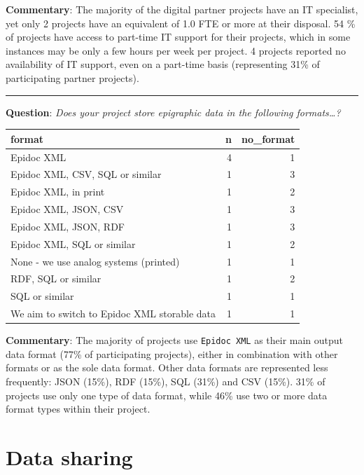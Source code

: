 \documentclass[
  12pt,
]{scrreprt}
\begin{document}
\normalsize

\textbf{Commentary}: The majority of the digital partner projects have
an IT specialist, yet only 2 projects have an equivalent of 1.0 FTE or
more at their disposal. 54 \% of projects have access to part-time IT
support for their projects, which in some instances may be only a few
hours per week per project. 4 projects reported no availability of IT
support, even on a part-time basis (representing 31\% of participating
partner projects).

\begin{center}\rule{0.5\linewidth}{0.5pt}\end{center}

\textbf{Question}: \emph{Does your project store epigraphic data in the
following formats\ldots?}

\footnotesize

\begin{longtable}[]{@{}lrr@{}}
\toprule
format & n & no\_format \\
\midrule
\endhead
Epidoc XML & 4 & 1 \\
Epidoc XML, CSV, SQL or similar & 1 & 3 \\
Epidoc XML, in print & 1 & 2 \\
Epidoc XML, JSON, CSV & 1 & 3 \\
Epidoc XML, JSON, RDF & 1 & 3 \\
Epidoc XML, SQL or similar & 1 & 2 \\
None - we use analog systems (printed) & 1 & 1 \\
RDF, SQL or similar & 1 & 2 \\
SQL or similar & 1 & 1 \\
We aim to switch to Epidoc XML storable data & 1 & 1 \\
\bottomrule
\end{longtable}

\normalsize

\footnotesize

\normalsize

\textbf{Commentary}: The majority of projects use \texttt{Epidoc\ XML}
as their main output data format (77\% of participating projects),
either in combination with other formats or as the sole data format.
Other data formats are represented less frequently: JSON (15\%), RDF
(15\%), SQL (31\%) and CSV (15\%). 31\% of projects use only one type of
data format, while 46\% use two or more data format types within their
project.

\hypertarget{data-sharing}{%
\section{Data sharing}\label{data-sharing}}
\end{document}
